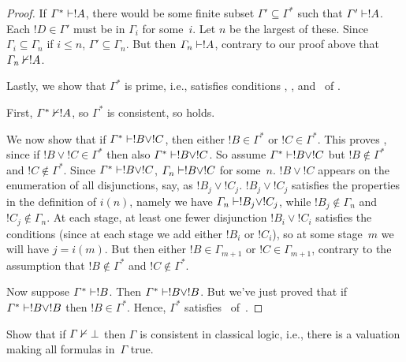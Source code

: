 \documentclass[../../../include/open-logic-section]{subfiles}
\begin{document}
\begin{proof}
  If $\Gamma^* \Proves !A$, there would be some finite subset $\Gamma'
  \subseteq \Gamma^*$ such that $\Gamma' \Proves !A$. Each $!D \in
  \Gamma'$ must be in $\Gamma_i$ for some~$i$.  Let $n$ be the largest
  of these. Since $\Gamma_i \subseteq \Gamma_n$ if $i \le n$, $\Gamma'
  \subseteq \Gamma_n$. But then $\Gamma_n \Proves !A$, contrary to our
  proof above that $\Gamma_n \Proves/ !A$.

  Lastly, we show that $\Gamma^*$ is prime, i.e., satisfies conditions
  , , and~ of
  .

  First, $\Gamma^* \Proves/ !A$, so $\Gamma^*$ is
  consistent, so  holds.

  We now show that if $\Gamma^* \Proves !B \lor !C$, then either $!B
  \in \Gamma^*$ or $!C \in \Gamma^*$. This proves ,
  since if $!B \lor !C \in \Gamma^*$ then also $\Gamma^* \Proves !B 
  \lor !C$. So assume $\Gamma^* \Proves !B \lor !C$ but $!B
  \notin \Gamma^*$ and $!C \notin \Gamma^*$. Since $\Gamma^* \Proves
  !B \lor !C$, $\Gamma_n \Proves !B \lor !C$ for some~$n$. $!B \lor
  !C$ appears on the enumeration of all disjunctions, say, as $!B_j
  \lor !C_j$. $!B_j \lor !C_j$ satisfies the properties in the
  definition of $i(n)$, namely we have $\Gamma_n \Proves !B_j
  \lor !C_j$, while $!B_j \notin \Gamma_n$ and $!C_j \notin \Gamma_n$. At
  each stage, at least one fewer disjunction $!B_i \lor !C_i$
  satisfies the conditions (since at each stage we add either $!B_i$
  or $!C_i$), so at some stage~$m$ we will have $j = i(m)$. But
  then either $!B \in \Gamma_{m+1}$ or $!C \in \Gamma_{m+1}$, contrary
  to the assumption that $!B \notin \Gamma^*$ and $!C \notin
  \Gamma^*$.

  Now suppose $\Gamma^* \Proves !B$. Then $\Gamma^* \Proves !B \lor
  !B$. But we've just proved that if $\Gamma^* \Proves !B \lor !B$
  then $!B \in \Gamma^*$. Hence, $\Gamma^*$
  satisfies~ of~.
\end{proof}

\begin{prob}
Show that if $\Gamma \Proves/ \bot$ then $\Gamma$ is consistent in 
classical logic, i.e., there is a valuation making all formulas 
in~$\Gamma$ true.
\end{prob}
\end{document}
